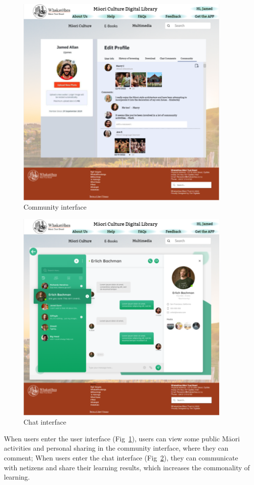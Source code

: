 \begin{figure}[htbp]
  \centerline{\includegraphics[width=300pt]{images/3-1-5.png}}
  \caption{Community interface}
  \label{fig3.1.3}
\end{figure}

\begin{figure}[htbp]
  \centerline{\includegraphics[width=300pt]{images/3-1-6.png}}
  \caption{Chat interface}
  \label{fig3.1.4}
\end{figure}

When users enter the user interface (Fig~\ref{fig3.1.3}), users can view some public Māori activities and personal sharing in the community interface, where they can comment; When users enter the chat interface (Fig~\ref{fig3.1.4}), they can communicate with netizens and share their learning results, which increases the commonality of learning.

